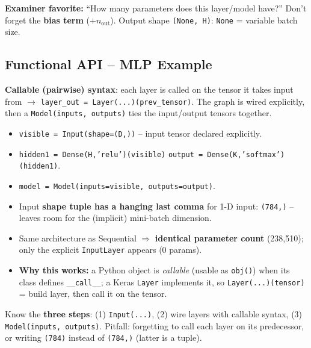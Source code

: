 \documentclass[10pt,a4paper]{article}
\begin{document}
	\begin{examtipbox}
		\textbf{Examiner favorite:} ``How many parameters does this layer/model have?'' Don't forget the \textbf{bias term} ($+n_{\text{out}}$). Output shape \texttt{(None, H)}: \texttt{None} = variable batch size.
	\end{examtipbox}

	\subsection{Functional API -- MLP Example}

	\begin{importantbox}
		\textbf{Callable (pairwise) syntax}: each layer is called on the tensor it takes input from $\to$ \texttt{layer\_out = Layer(...)(prev\_tensor)}. The graph is wired explicitly, then a \texttt{Model(inputs, outputs)} ties the input/output tensors together.
	\end{importantbox}

	\begin{itemize}[leftmargin=*]
		\item \texttt{visible = Input(shape=(D,))} -- input tensor declared explicitly.
		\item \texttt{hidden1 = Dense(H,'relu')(visible)} \quad \texttt{output = Dense(K,'softmax')(hidden1)}.
		\item \texttt{model = Model(inputs=visible, outputs=output)}.
		\item Input \textbf{shape tuple has a hanging last comma} for 1-D input: \texttt{(784,)} -- leaves room for the (implicit) mini-batch dimension.
		\item Same architecture as Sequential $\Rightarrow$ \textbf{identical parameter count} (238{,}510); only the explicit \texttt{InputLayer} appears (0 params).
		\item \textbf{Why this works:} a Python object is \emph{callable} (usable as \texttt{obj()}) when its class defines \texttt{\_\_call\_\_}; a Keras \texttt{Layer} implements it, so \texttt{Layer(...)(tensor)} = build layer, then call it on the tensor.
	\end{itemize}

	\begin{examtipbox}
		Know the \textbf{three steps}: (1) \texttt{Input(...)}, (2) wire layers with callable syntax, (3) \texttt{Model(inputs, outputs)}. Pitfall: forgetting to call each layer on its predecessor, or writing \texttt{(784)} instead of \texttt{(784,)} (latter is a tuple).
	\end{examtipbox}
\end{document}
